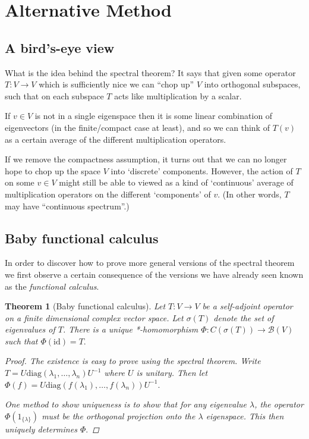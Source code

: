 \documentclass[a4paper,11pt,twoside]{amsart}
\newtheorem*{theorem}{Theorem}
\theoremstyle{definition}
\begin{document}
\section{Alternative Method}
\subsection{A bird's-eye view}
What is the idea behind the spectral theorem? It says that given some operator $T\colon V \to V$ which is sufficiently nice we can ``chop up'' $V$ into orthogonal subspaces, such that on each subspace $T$ acts like multiplication by a scalar.

If $v \in V$ is not in a single eigenspace then it is some linear combination of eigenvectors (in the finite/compact case at least), and so we can think of $T(v)$ as a certain average of the different multiplication operators.

If we remove the compactness assumption, it turns out that we can no longer hope to chop up the space $V$ into `discrete' components. However, the action of $T$ on some $v \in V$ might still be able to viewed as a kind of `continuous' average of multiplication operators on the different `components' of $v$. (In other words, $T$ may have ``continuous spectrum''.)

\subsection{Baby functional calculus}
In order to discover how to prove more general versions of the spectral theorem we first observe a certain consequence of the versions we have already seen known as the \emph{functional calculus}.

\begin{theorem}[Baby functional calculus]
Let $T \colon V \to V$ be a self-adjoint operator on a finite dimensional complex vector space. Let $\sigma(T)$ denote the set of eigenvalues of $T$. There is a unique *-homomorphism $\Phi \colon C(\sigma(T)) \to \mathcal{B}(V)$ such that $\Phi(\mathrm{id}) = T.$
\begin{proof}
The existence is easy to prove using the spectral theorem. Write $T = U \mathrm{diag}(\lambda_1, \ldots,\lambda_n) U^{-1}$ where $U$ is unitary. Then let $\Phi(f) = U \mathrm{diag}(f(\lambda_1), \ldots,f(\lambda_n)) U^{-1}.$

One method to show uniqueness is to show that for any eigenvalue $\lambda$, the operator $\Phi(1_{\{\lambda\}})$ must be the orthogonal projection onto the $\lambda$ eigenspace. This then uniquely determines $\Phi.$
\end{proof}
\end{theorem}
\end{document}
